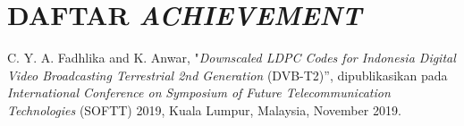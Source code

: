 \chapter*{DAFTAR \textit{ACHIEVEMENT}}

C. Y. A. Fadhlika and K. Anwar, "\textit{Downscaled LDPC Codes for Indonesia Digital Video Broadcasting Terrestrial 2nd Generation} (DVB-T2)”, dipublikasikan pada \textit{International Conference on}
\textit{Symposium of Future Telecommunication Technologies} (SOFTT) 2019, Kuala
Lumpur, Malaysia, November 2019.